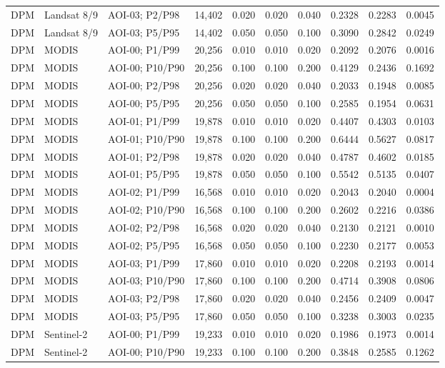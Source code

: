 \begin{landscape}
\begin{longtable}{lllrrrrrrr}
DPM & Landsat 8/9 & AOI-03; P2/P98 & 14,402 & 0.020 & 0.020 & 0.040 & 0.2328 & 0.2283 & 0.0045 \\
DPM & Landsat 8/9 & AOI-03; P5/P95 & 14,402 & 0.050 & 0.050 & 0.100 & 0.3090 & 0.2842 & 0.0249 \\
DPM & MODIS & AOI-00; P1/P99 & 20,256 & 0.010 & 0.010 & 0.020 & 0.2092 & 0.2076 & 0.0016 \\
DPM & MODIS & AOI-00; P10/P90 & 20,256 & 0.100 & 0.100 & 0.200 & 0.4129 & 0.2436 & 0.1692 \\
DPM & MODIS & AOI-00; P2/P98 & 20,256 & 0.020 & 0.020 & 0.040 & 0.2033 & 0.1948 & 0.0085 \\
DPM & MODIS & AOI-00; P5/P95 & 20,256 & 0.050 & 0.050 & 0.100 & 0.2585 & 0.1954 & 0.0631 \\
DPM & MODIS & AOI-01; P1/P99 & 19,878 & 0.010 & 0.010 & 0.020 & 0.4407 & 0.4303 & 0.0103 \\
DPM & MODIS & AOI-01; P10/P90 & 19,878 & 0.100 & 0.100 & 0.200 & 0.6444 & 0.5627 & 0.0817 \\
DPM & MODIS & AOI-01; P2/P98 & 19,878 & 0.020 & 0.020 & 0.040 & 0.4787 & 0.4602 & 0.0185 \\
DPM & MODIS & AOI-01; P5/P95 & 19,878 & 0.050 & 0.050 & 0.100 & 0.5542 & 0.5135 & 0.0407 \\
DPM & MODIS & AOI-02; P1/P99 & 16,568 & 0.010 & 0.010 & 0.020 & 0.2043 & 0.2040 & 0.0004 \\
DPM & MODIS & AOI-02; P10/P90 & 16,568 & 0.100 & 0.100 & 0.200 & 0.2602 & 0.2216 & 0.0386 \\
DPM & MODIS & AOI-02; P2/P98 & 16,568 & 0.020 & 0.020 & 0.040 & 0.2130 & 0.2121 & 0.0010 \\
DPM & MODIS & AOI-02; P5/P95 & 16,568 & 0.050 & 0.050 & 0.100 & 0.2230 & 0.2177 & 0.0053 \\
DPM & MODIS & AOI-03; P1/P99 & 17,860 & 0.010 & 0.010 & 0.020 & 0.2208 & 0.2193 & 0.0014 \\
DPM & MODIS & AOI-03; P10/P90 & 17,860 & 0.100 & 0.100 & 0.200 & 0.4714 & 0.3908 & 0.0806 \\
DPM & MODIS & AOI-03; P2/P98 & 17,860 & 0.020 & 0.020 & 0.040 & 0.2456 & 0.2409 & 0.0047 \\
DPM & MODIS & AOI-03; P5/P95 & 17,860 & 0.050 & 0.050 & 0.100 & 0.3238 & 0.3003 & 0.0235 \\
DPM & Sentinel-2 & AOI-00; P1/P99 & 19,233 & 0.010 & 0.010 & 0.020 & 0.1986 & 0.1973 & 0.0014 \\
DPM & Sentinel-2 & AOI-00; P10/P90 & 19,233 & 0.100 & 0.100 & 0.200 & 0.3848 & 0.2585 & 0.1262 \\

\end{longtable}
\end{landscape}
